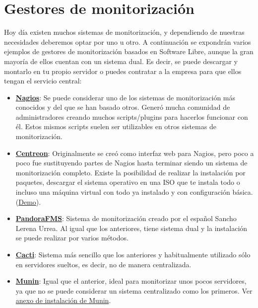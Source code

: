 \section{Gestores de monitorización}
Hoy día existen muchos sistemas de monitorización, y dependiendo de nuestras necesidades deberemos optar por uno u otro. A continuación se expondrán varios ejemplos de gestores de monitorización basados en Software Libre, aunque la gran mayoría de ellos cuentan con un sistema dual. Es decir, se puede descargar y montarlo en tu propio servidor o puedes contratar a la empresa para que ellos tengan el servicio central:
\begin{itemize}
    \item \textbf{\href{https://es.wikipedia.org/wiki/Nagios}{Nagios}}: Se puede considerar uno de los sistemas de monitorización más conocidos y del que se han basado otros. Generó mucha comunidad de administradores creando muchos scripts/plugins para hacerlos funcionar con él. Estos mismos scripts suelen ser utilizables en otros sistemas de monitorización.

    \item \textbf{\href{https://www.centreon.com/}{Centreon}}: Originalmente se creó como interfaz web para Nagios, pero poco a poco fue sustituyendo partes de Nagios hasta terminar siendo un sistema de monitorización completo. Existe la posibilidad de realizar la instalación por paquetes, descargar el sistema operativo en una ISO que te instala todo o incluso una máquina virtual con todo ya instalado y con configuración básica. (\href{https://demo.centreon.com/centreon/index.php}{Demo}).

    \item \textbf{\href{https://pandorafms.com/es/}{PandoraFMS}}: Sistema de monitorización creado por el español Sancho Lerena Urrea. Al igual que los anteriores, tiene sistema dual y la instalación se puede realizar por varios métodos.

    \item \textbf{\href{https://www.cacti.net/}{Cacti}}: Sistema más sencillo que los anteriores y habitualmente utilizado sólo en servidores sueltos, es decir, no de manera centralizada.

    \item \textbf{\href{https://munin-monitoring.org/}{Munin}}: Igual que el anterior, ideal para monitorizar unos pocos servidores, ya que no se puede considerar un sistema centralizado como los primeros. Ver \hyperlink{instalar_munin}{anexo de instalación de Munin}.
\end{itemize}


